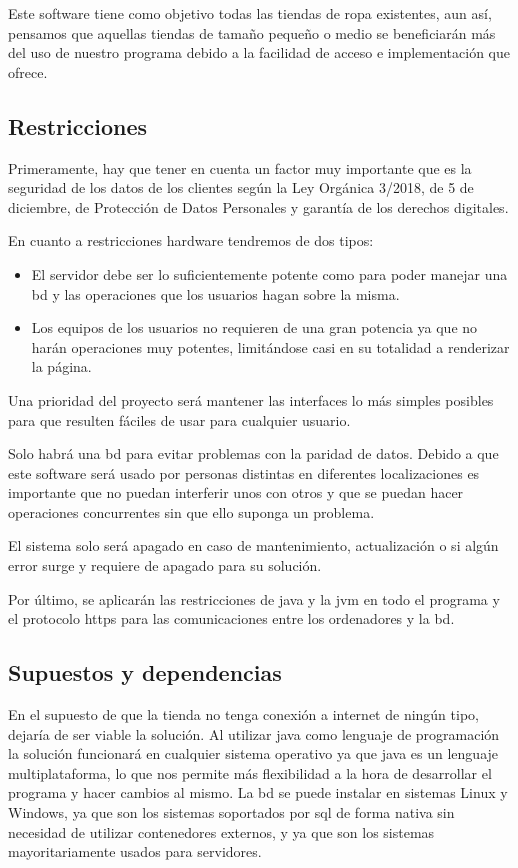 Este software tiene como objetivo todas las tiendas de ropa existentes, aun así, pensamos
que aquellas tiendas de tamaño pequeño o medio se beneficiarán más del uso de
nuestro programa debido a la facilidad de acceso e implementación que ofrece.
\subsection{Restricciones}
Primeramente, hay que tener en cuenta un factor muy importante que es la seguridad
de los datos de los clientes según la Ley Orgánica 3/2018, de 5 de diciembre, de Protección de Datos Personales y garantía de los derechos digitales\cite{prot_datos}.

En cuanto a restricciones hardware tendremos de dos tipos:
\begin{itemize}
    \item El servidor debe ser lo suficientemente potente como para poder manejar una \gls{bd} y las operaciones que los usuarios hagan sobre la misma.
    \item Los equipos de los usuarios no requieren de una gran potencia ya que no harán operaciones muy potentes, limitándose casi en su totalidad a renderizar la página.
\end{itemize}

Una prioridad del proyecto será mantener las interfaces lo más simples posibles para que resulten fáciles de usar para cualquier usuario.

Solo habrá una \gls{bd} para evitar problemas con la paridad de datos. Debido a que este software será usado por personas distintas en diferentes localizaciones es importante que no puedan interferir unos con otros y que se puedan hacer operaciones concurrentes sin que ello suponga un problema.

El sistema solo será apagado en caso de mantenimiento, actualización o si algún error surge y requiere de apagado para su solución.

Por último, se aplicarán las restricciones de java y la \gls{jvm} en todo el programa y el protocolo \gls{https} para las comunicaciones entre los ordenadores y la \gls{bd}.
\subsection{Supuestos y dependencias}
En el supuesto de que la tienda no tenga conexión a internet de ningún tipo, dejaría de ser viable la solución.
Al utilizar java como lenguaje de programación la solución funcionará en cualquier sistema operativo ya que java es un lenguaje multiplataforma, lo que nos permite más flexibilidad a la hora de desarrollar el programa y hacer cambios al mismo. La \gls{bd} se puede instalar en sistemas Linux y Windows, ya que son los sistemas soportados por \gls{sql} de forma nativa sin necesidad de utilizar contenedores externos, y ya que son los sistemas mayoritariamente usados para servidores.

